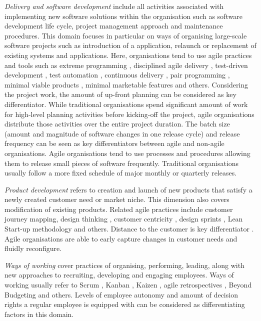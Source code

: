 \documentclass{article}
\newcommand{\myremark}[1]{{#1}}
\newcommand{\rmremark}[1]{\myremark{\color{red} [Ralf: #1]}}
\begin{document}
\textit{Delivery and software development} include all activities associated with implementing new software solutions within the organisation such as software development life cycle, project management approach and maintenance procedures. This domain focuses in particular on ways of organising large-scale software projects such as introduction of a application, relaunch or replacement of existing systems and applications. Here, organisations tend to use agile practices and tools such as extreme programming \cite{Beck2001}, disciplined agile delivery \cite{ambler2012}, test-driven development \cite{beck2003testdriven}, test automation \cite{collins2012software}, continuous delivery \cite{humble2010continuous}, pair programming \cite{vanhanen2007experiences}, minimal viable products \cite{lenarduzzi2016mvp}, minimal marketable features \cite{cleland2005mmf} and others. Considering the project work, the amount of up-front planning can be considered as key differentiator. While traditional organisations spend significant amount of work for high-level planning activities before kicking-off the project, agile organisations distribute those activities over the entire project duration. The batch size (amount and magnitude of software changes in one release cycle) and release frequency can be seen as key differentiators between agile and non-agile organisations. Agile organisations tend to use processes and procedures allowing them to release small pieces of software frequently. Traditional organisations usually follow a more fixed schedule of major monthly or quarterly releases.

\textit{Product development} refers to creation and launch of new products that satisfy a newly created customer need or market niche. This dimension also covers modification of existing products. Related agile practices include customer journey mapping, design thinking \cite{liedtka2018design}, customer centricity \cite{shah2006path}, design sprints \cite{banfield2015design}, Lean Start-up methodology \cite{reis2011lean} and others. Distance to the customer is key differentiator \cite{Rigby2016}. Agile organisations are able to early capture changes in customer needs and fluidly reconfigure.

\textit{Ways of working} cover practices of organising, performing, leading, along with new approaches to recruiting, developing and engaging employees. Ways of working usually refer to Scrum \cite{schwaber2002agile}, Kanban \cite{ahmad2013kanban}, Kaizen \cite{berger1997}, agile retrospectives \cite{derby2006agile}, Beyond Budgeting \cite{libby2010beyond} and others. Levels of employee autonomy and amount of decision rights a regular employee is equipped with can be considered as differentiating factors in this domain.
\end{document}
